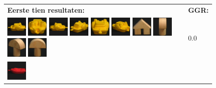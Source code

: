 \begin{figure}[!p]
\begin{center}
\begin{tabular}{m{11cm} | m{3cm} |}
\textbf{Eerste tien resultaten:} & \textbf{GGR:} \\
\vspace{4pt}
\includegraphics[width=1cm]{coil/beeld-12.eps}
\includegraphics[width=1cm]{coil/beeld-17.eps}
\includegraphics[width=1cm]{coil/beeld-13.eps}
\includegraphics[width=1cm]{coil/beeld-15.eps}
\includegraphics[width=1cm]{coil/beeld-14.eps}
\includegraphics[width=1cm]{coil/beeld-16.eps}
\includegraphics[width=1cm]{coil/beeld-42.eps}
\includegraphics[width=1cm]{coil/beeld-5.eps}
\includegraphics[width=1cm]{coil/beeld-4.eps}
\includegraphics[width=1cm]{coil/beeld-1.eps}
& {\scriptsize 0.0}
\\
\includegraphics[width=1cm]{coil/beeld-18.eps}

\end{tabular}
\end{center}
\end{figure}
